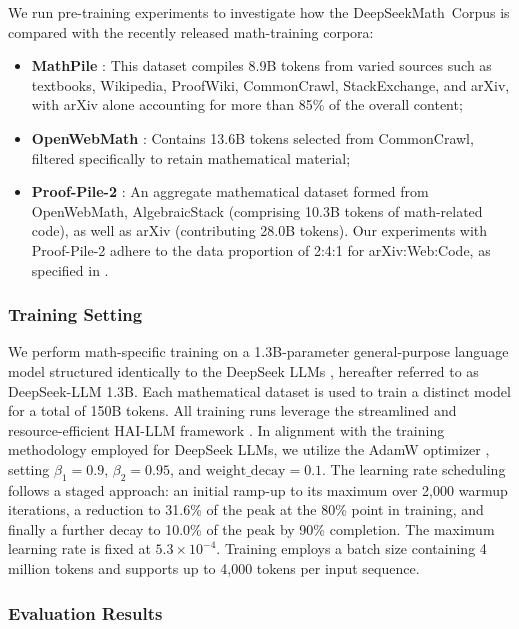 \begin{itemize}[topsep=0pt]
We run pre-training experiments to investigate how the DeepSeekMath~Corpus is compared with the recently released math-training corpora:

\begin{itemize}[topsep=0pt]
    \item \textbf{MathPile} \citep{mathpile}: This dataset compiles 8.9B tokens from varied sources such as textbooks, Wikipedia, ProofWiki, CommonCrawl, StackExchange, and arXiv, with arXiv alone accounting for more than 85\% of the overall content;
    \item \textbf{OpenWebMath} \citep{openwebmath}: Contains 13.6B tokens selected from CommonCrawl, filtered specifically to retain mathematical material;
    \item \textbf{Proof-Pile-2} \citep{llemma}: An aggregate mathematical dataset formed from OpenWebMath, AlgebraicStack (comprising 10.3B tokens of math-related code), as well as arXiv (contributing 28.0B tokens). Our experiments with Proof-Pile-2 adhere to the data proportion of 2:4:1 for arXiv:Web:Code, as specified in \cite{llemma}.
\end{itemize}

\subsubsection{Training Setting}
\label{sec:quality-policy}
We perform math-specific training on a 1.3B-parameter general-purpose language model structured identically to the DeepSeek LLMs \citep{deepseek-llm}, hereafter referred to as DeepSeek-LLM 1.3B. Each mathematical dataset is used to train a distinct model for a total of 150B tokens. All training runs leverage the streamlined and resource-efficient HAI-LLM framework \citep{haillm}. In alignment with the training methodology employed for DeepSeek LLMs, we utilize the AdamW optimizer \citep{adamW}, setting $\beta_1=0.9$, $\beta_2=0.95$, and $\mathrm{weight\_decay}=0.1$. The learning rate scheduling follows a staged approach: an initial ramp-up to its maximum over 2,000 warmup iterations, a reduction to 31.6\% of the peak at the 80\% point in training, and finally a further decay to 10.0\% of the peak by 90\% completion. The maximum learning rate is fixed at $5.3\times10^{-4}$. Training employs a batch size containing 4 million tokens and supports up to 4,000 tokens per input sequence.

\subsubsection{Evaluation Results}


\end{itemize}
